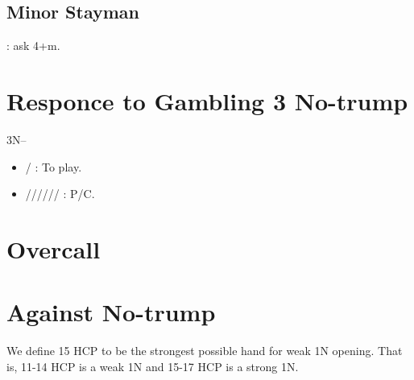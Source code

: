 \documentclass[12pt,twoside,a5paper]{report}%
\begin{document}
	\section*{Minor Stayman}
	 : ask 4+m.

\chapter*{Responce to Gambling 3 No-trump}
	3N--\\
	\begin{itemize}
	\renewcommand{\labelitemi}{}
	\item {}/ : To play.
	\item {}////// : P/C.
	\end{itemize}

\chapter*{Overcall}
\chapter*{Against No-trump}
	We define 15 HCP to be the strongest possible hand for weak 1N opening. That is, 11-14 HCP is a weak 1N and 15-17 HCP is a strong 1N. 
\end{document}
